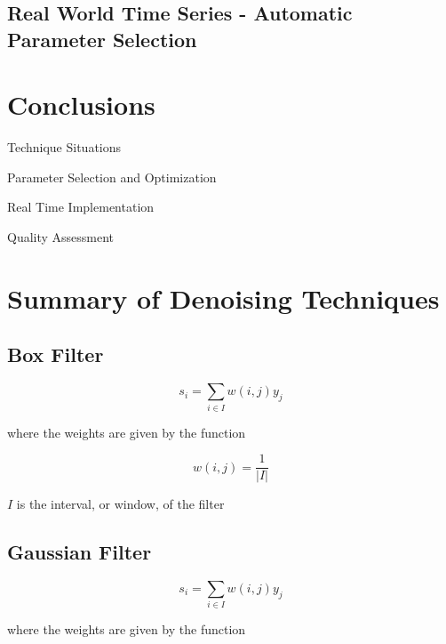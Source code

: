 \documentclass[11pt]{article}
\theoremstyle{definition}
\begin{document}
\newpage


\subsection{Real World Time Series - Automatic Parameter Selection}


\section{Conclusions}


Technique Situations

Parameter Selection and Optimization

Real Time Implementation

Quality Assessment


\FloatBarrier

%

  
\pagebreak

\appendix

\section{Summary of Denoising Techniques}

\subsection{Box Filter}

\begin{displaymath}
s_i = \sum _{i \in I} w \left(i, j \right) y_j
\end{displaymath}

\noindent
where the weights are given by the function

\begin{displaymath}
w\left(i, j\right) = \frac{1}{\lvert I \rvert}
\end{displaymath}

\noindent
$I$ is the interval, or window, of the filter


\subsection{Gaussian Filter}

\begin{displaymath}
s_i = \sum _{i \in I} w \left(i, j \right) y_j
\end{displaymath}

\noindent
where the weights are given by the function
\end{document}
